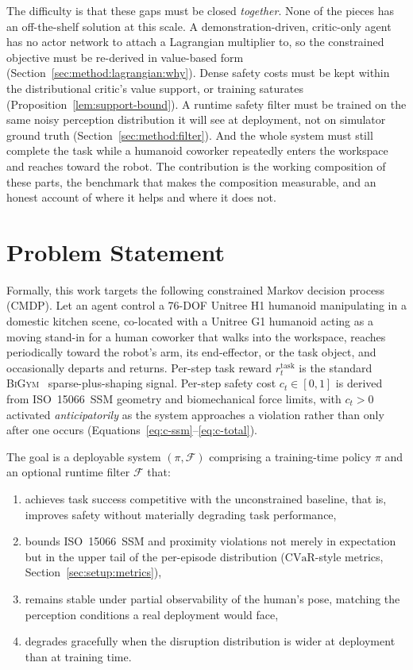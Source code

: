 \documentclass[11pt,a4paper]{report}
\newcommand{\ssm}{SSM}
\newcommand{\iso}{ISO~15066}
\newcommand{\cvar}{\ensuremath{\mathrm{CVaR}}}
\newcommand{\bigym}{\textsc{BiGym}}
\begin{document}
The difficulty is that these gaps must be closed \emph{together}. None
of the pieces has an off-the-shelf solution at this scale. A
demonstration-driven, critic-only agent has no actor network to attach
a Lagrangian multiplier to, so the constrained objective must be
re-derived in value-based form
(Section~\ref{sec:method:lagrangian:why}). Dense safety costs must be
kept within the distributional critic's value support, or training
saturates (Proposition~\ref{lem:support-bound}). A runtime safety
filter must be trained on the same noisy perception distribution it
will see at deployment, not on simulator ground truth
(Section~\ref{sec:method:filter}). And the whole system must still
complete the task while a humanoid coworker repeatedly enters the
workspace and reaches toward the robot. The contribution is the
working composition of these parts, the benchmark that makes the
composition measurable, and an honest account of where it helps and
where it does not.

\section{Problem Statement}
\label{sec:intro:problem}

Formally, this work targets the following constrained Markov
decision process (CMDP). Let an agent control a 76-DOF Unitree H1
humanoid manipulating in a domestic kitchen scene, co-located with a
Unitree G1 humanoid acting as a moving stand-in for a human coworker that walks
into the workspace, reaches periodically toward the robot's arm,
its end-effector, or the task object, and occasionally departs and
returns. Per-step task reward $r^{\mathrm{task}}_t$ is the standard
\bigym{}~\cite{chernyadev2024bigym} sparse-plus-shaping signal.
Per-step safety cost $c_t \in [0,1]$ is derived from \iso{}~\ssm{}
geometry and biomechanical force limits, with $c_t > 0$ activated
\emph{anticipatorily} as the system approaches a violation rather
than only after one occurs (Equations~\ref{eq:c-ssm}--\ref{eq:c-total}).

The goal is a deployable system $(\pi, \mathcal{F})$ comprising a
training-time policy $\pi$ and an optional runtime filter
$\mathcal{F}$ that:
\begin{enumerate}[topsep=2pt,itemsep=1pt]
\item achieves task success competitive with the unconstrained
  baseline, that is, improves safety without materially degrading
  task performance,
\item bounds \iso{}~\ssm{} and proximity violations not merely in
  expectation but in the upper tail of the per-episode distribution
  (\cvar{}-style metrics, Section~\ref{sec:setup:metrics}),
\item remains stable under partial observability of the human's pose,
  matching the perception conditions a real deployment would face,
\item degrades gracefully when the disruption distribution is wider
  at deployment than at training time.
\end{enumerate}
\end{document}
